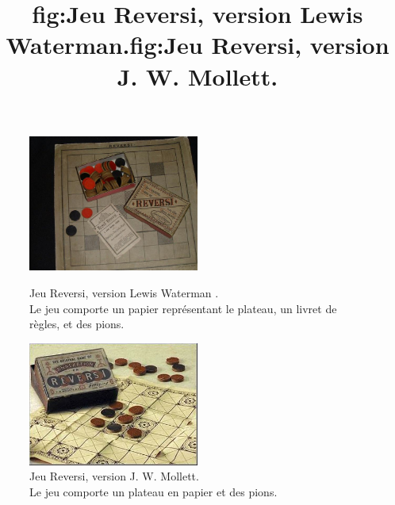 \documentclass[a4paper,12pt]{article}
\begin{document}
\begin{figure}[h]
    \centering
    \includegraphics[width=0.5\textwidth]{images/reversi_waterman-1880.jpg}
    \caption{Jeu Reversi, version Lewis Waterman .\\
        Le jeu comporte un papier représentant le plateau, un livret de règles, et des pions.}
    \title{fig:Jeu Reversi, version Lewis Waterman.}

    \centering
    \includegraphics[width=0.5\textwidth]{images/reversi_mollett-1880.jpg}
    \caption{Jeu Reversi, version J. W. Mollett.\\
        Le jeu comporte un plateau en papier et des pions.}
    \title{fig:Jeu Reversi, version J. W. Mollett.}
\end{figure}
\end{document}

